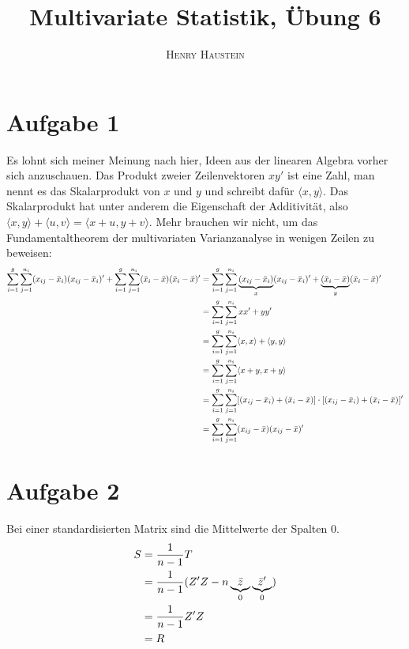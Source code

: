 \documentclass{article}
\title{\textbf{Multivariate Statistik, Übung 6}}
\author{\textsc{Henry Haustein}}
\date{}
\begin{document}
	\maketitle
	
	\section*{Aufgabe 1}
	Es lohnt sich meiner Meinung nach hier, Ideen aus der linearen Algebra vorher sich anzuschauen. Das Produkt zweier Zeilenvektoren $xy'$ ist eine Zahl, man nennt es das Skalarprodukt von $x$ und $y$ und schreibt dafür $\langle x,y\rangle$. Das Skalarprodukt hat unter anderem die Eigenschaft der Additivität, also $\langle x,y\rangle + \langle u,v\rangle = \langle x+u,y+v\rangle$. Mehr brauchen wir nicht, um das Fundamentaltheorem der multivariaten Varianzanalyse in wenigen Zeilen zu beweisen:
	\begin{align}
		\sum_{i=1}^{g}\sum_{j=1}^{n_i} (x_{ij}-\bar{x}_i)(x_{ij}-\bar{x}_i)' + \sum_{i=1}^g\sum_{j=1}^{n_i} (\bar{x}_i - \bar{x})(\bar{x}_i - \bar{x})' &= \sum_{i=1}^{g}\sum_{j=1}^{n_i} \underbrace{(x_{ij}-\bar{x}_i)}_{x}(x_{ij}-\bar{x}_i)' + \underbrace{(\bar{x}_i - \bar{x})}_{y}(\bar{x}_i - \bar{x})' \notag \\
		&= \sum_{i=1}^{g}\sum_{j=1}^{n_i} xx' + yy' \notag \\
		&= \sum_{i=1}^{g}\sum_{j=1}^{n_i} \langle x,x\rangle + \langle y,y\rangle \notag \\
		&= \sum_{i=1}^{g}\sum_{j=1}^{n_i} \langle x+y,x+y\rangle \notag \\
		&= \sum_{i=1}^{g}\sum_{j=1}^{n_i} [(x_{ij}-\bar{x}_i) + (\bar{x}_i - \bar{x})]\cdot [(x_{ij}-\bar{x}_i) + (\bar{x}_i - \bar{x})]' \notag \\
		&= \sum_{i=1}^{g}\sum_{j=1}^{n_i} (x_{ij}-\bar{x})(x_{ij}-\bar{x})' \notag
	\end{align}

	\section*{Aufgabe 2}
	Bei einer standardisierten Matrix sind die Mittelwerte der Spalten 0.
	\begin{align}
		S &= \frac{1}{n-1}T \notag \\
		&= \frac{1}{n-1}(Z'Z - n\underbrace{\bar{z}}_0\underbrace{\bar{z}'}_0) \notag \\
		&= \frac{1}{n-1}Z'Z \notag \\
		&= R \notag
	\end{align}
\end{document}
